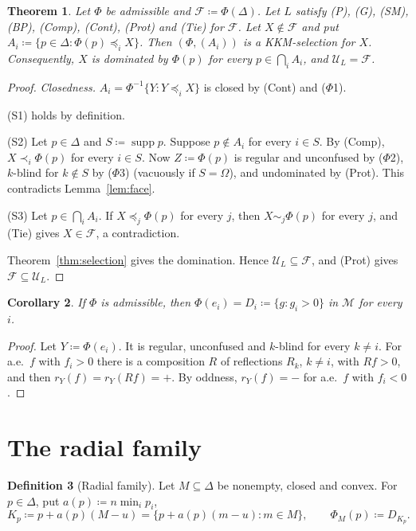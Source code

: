 \documentclass[11pt]{article}
\newtheorem{theorem}{Theorem}[section]
\newtheorem{corollary}[theorem]{Corollary}
\theoremstyle{definition}
\newtheorem{definition}[theorem]{Definition}
\theoremstyle{remark}
\newcommand{\M}{\mathcal M}
\newcommand{\U}{\mathcal U}
\newcommand{\F}{\mathcal F}
\newcommand{\supp}{\operatorname{supp}}
\begin{document}
\begin{theorem}\label{thm:main}
Let $\Phi$ be admissible and $\F\coloneqq\Phi(\Delta)$. Let $L$ satisfy (P), (G), (SM), (BP), (Comp), (Cont), (Prot) and (Tie) for $\F$. Let $X\notin\F$ and put $A_i\coloneqq\{p\in\Delta:\Phi(p)\preceq_iX\}$. Then $(\Phi,(A_i))$ is a KKM-selection for $X$. Consequently, $X$ is dominated by $\Phi(p)$ for every $p\in\bigcap_iA_i$, and $\U_L=\F$.
\end{theorem}
\begin{proof}
\emph{Closedness.} $A_i=\Phi^{-1}\{Y:Y\preceq_iX\}$ is closed by (Cont) and ($\Phi$1).

(S1) holds by definition.

(S2) Let $p\in\Delta$ and $S\coloneqq\supp p$. Suppose $p\notin A_i$ for every $i\in S$. By (Comp), $X\prec_i\Phi(p)$ for every $i\in S$. Now $Z\coloneqq\Phi(p)$ is regular and unconfused by ($\Phi$2), $k$-blind for $k\notin S$ by ($\Phi$3) (vacuously if $S=\Omega$), and undominated by (Prot). This contradicts Lemma~\ref{lem:face}.

(S3) Let $p\in\bigcap_iA_i$. If $X\preceq_j\Phi(p)$ for every $j$, then $X\sim_j\Phi(p)$ for every $j$, and (Tie) gives $X\in\F$, a contradiction.

Theorem~\ref{thm:selection} gives the domination. Hence $\U_L\subseteq\F$, and (Prot) gives $\F\subseteq\U_L$.
\end{proof}

\begin{corollary}\label{cor:vertices}
If $\Phi$ is admissible, then $\Phi(e_i)=D_i\coloneqq\{g:g_i>0\}$ in $\M$ for every $i$.
\end{corollary}
\begin{proof}
Let $Y\coloneqq\Phi(e_i)$. It is regular, unconfused and $k$-blind for every $k\neq i$. For a.e.\ $f$ with $f_i>0$ there is a composition $R$ of reflections $R_k$, $k\neq i$, with $Rf>0$, and then $r_Y(f)=r_Y(Rf)=+$. By oddness, $r_Y(f)=-$ for a.e.\ $f$ with $f_i<0$.
\end{proof}

\section{The radial family}\label{sec:radial}

\begin{definition}[Radial family]\label{def:radial}
Let $M\subseteq\Delta$ be nonempty, closed and convex. For $p\in\Delta$, put $a(p)\coloneqq n\min_ip_i$,
\[
K_p\coloneqq p+a(p)(M-u)=\{p+a(p)(m-u):m\in M\},\qquad \Phi_M(p)\coloneqq D_{K_p}.
\]
\end{definition}
\end{document}
